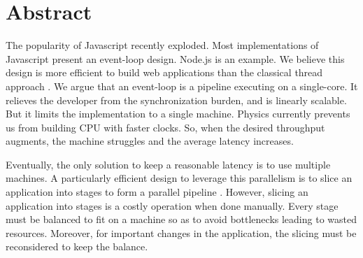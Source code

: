 \section*{Abstract}








The popularity of Javascript recently exploded.
Most implementations of Javascript present an event-loop design.
Node.js is an example.
We believe this design is more efficient to build web applications than the classical thread approach \cite{Lei2014}.
We argue that an event-loop is a pipeline executing on a single-core.
It relieves the developer from the synchronization burden, and is linearly scalable.
But it limits the implementation to a single machine.
Physics currently prevents us from building CPU with faster clocks.
So, when the desired throughput augments, the machine struggles and the average latency increases.

Eventually, the only solution to keep a reasonable latency is to use multiple machines.
A particularly efficient design to leverage this parallelism is to slice an application into stages to form a parallel pipeline \cite{Welsh2000}.
However, slicing an application into stages is a costly operation when done manually.
Every stage must be balanced to fit on a machine so as to avoid bottlenecks leading to wasted resources.
Moreover, for important changes in the application, the slicing must be reconsidered to keep the balance.


